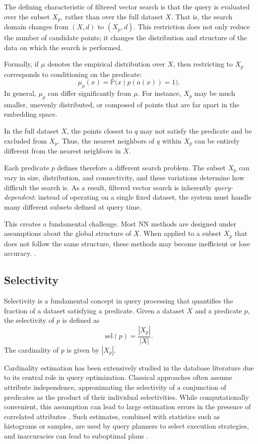 \medskip
The defining characteristic of filtered vector search is that the query is evaluated over the subset $X_p$, rather than over the full dataset $X$. That is, the search domain changes from $(X, d)$ to $(X_p, d)$. This restriction does not only reduce the number of candidate points; it changes the distribution and structure of the data on which the search is performed.

Formally, if $\mu$ denotes the empirical distribution over $X$, then restricting to $X_p$ corresponds to conditioning on the predicate:
\[
\mu_p(x) = \mathbb{P}\big(x \mid p(a(x)) = 1\big).
\]
In general, $\mu_p$ can differ significantly from $\mu$. For instance, $X_p$ may be much smaller, unevenly distributed, or composed of points that are far apart in the embedding space.

In the full dataset $X$, the points closest to $q$ may not satisfy the predicate and be excluded from $X_p$. Thus, the nearest neighbors of $q$ within $X_p$ can be entirely different from the nearest neighbors in $X$.

Each predicate $p$ defines therefore a different search problem. The subset $X_p$ can vary in size, distribution, and connectivity, and these variations determine how difficult the search is. As a result, filtered vector search is inherently \emph{query-dependent}: instead of operating on a single fixed dataset, the system must handle many different subsets defined at query time.

This creates a fundamental challenge. Most NN methods are designed under assumptions about the global structure of $X$. When applied to a subset $X_p$ that does not follow the same structure, these methods may become inefficient or lose accuracy. \cite{acorn, labelsvectors, nhq, caminal2025filtered}.

\subsection{Selectivity}\label{sec:selectivity}

Selectivity is a fundamental concept in query processing that quantifies the fraction of a dataset satisfying a predicate. Given a dataset \(X\) and a predicate \(p\), the selectivity of \(p\) is defined as
\[
\text{sel}(p) = \frac{|X_p|}{|X|}.
\]
The cardinality of \(p\) is given by \(|X_p|\).

Cardinality estimation has been extensively studied in the database literature due to its central role in query optimization. Classical approaches often assume attribute independence, approximating the selectivity of a conjunction of predicates as the product of their individual selectivities. While computationally convenient, this assumption can lead to large estimation errors in the presence of correlated attributes \cite{taskar2001}. Such estimates, combined with statistics such as histograms or samples, are used by query planners to select execution strategies, and inaccuracies can lead to suboptimal plans \cite{lynch2001selectivity, lpbound}.


